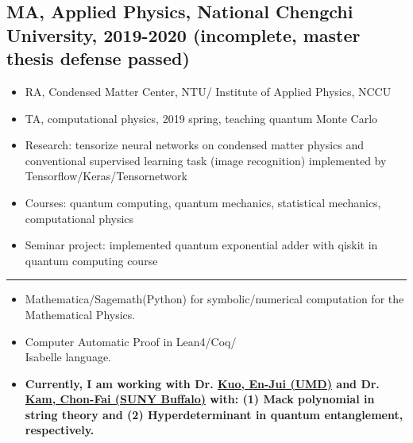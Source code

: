 \begin{educationbox}
\begin{itemize}[noitemsep]
    \end{itemize}

\subsection*{MA, Applied Physics, National Chengchi University, 2019-2020 (incomplete, master thesis defense passed)}

    \begin{itemize}[noitemsep]
        \item RA, Condensed Matter Center, NTU/ Institute of Applied Physics, NCCU
        \item TA, computational physics, 2019 spring, teaching quantum Monte Carlo
        \item Research: tensorize neural networks on condensed matter physics and conventional supervised learning task (image recognition) implemented by Tensorflow/Keras/Tensornetwork
        \item Courses: quantum computing, quantum mechanics, statistical mechanics, computational physics
        \item Seminar project: implemented quantum exponential adder with qiskit in quantum computing course 
    \end{itemize}
\end{educationbox}

\hrule

\begin{researchbox}
\begin{itemize}[noitemsep]
    \item Mathematica/Sagemath(Python) for symbolic/numerical computation for the Mathematical Physics.
    \item Computer Automatic Proof in Lean4/Coq/\\Isabelle language.  
    \item \textbf{ Currently, I am working with Dr. \href{https://www.bing.com/search?q=en-jui+kuo&gs_lcrp=EgZjaHJvbWUqBggBEEUYOzIGCAAQRRg5MgYIARBFGDsyBggCEEUYOzIGCAMQRRg7MgYIBBAAGEAyBggFEAAYQDIGCAYQRRg9MgYIBxBFGDwyBggIEEUYPNIBCDE2NjVqMGoxqAIAsAIA&FORM=ANAB01&PC=HCTS}{Kuo, En-Jui (UMD)} and Dr. \href{https://scholar.google.com/hk/citations?user=38TPAxMAAAAJ&hl=en}{Kam, Chon-Fai (SUNY Buffalo)} with: (1) Mack polynomial in string theory and (2) Hyperdeterminant in quantum entanglement, respectively. }
\end{itemize}
\end{researchbox}
